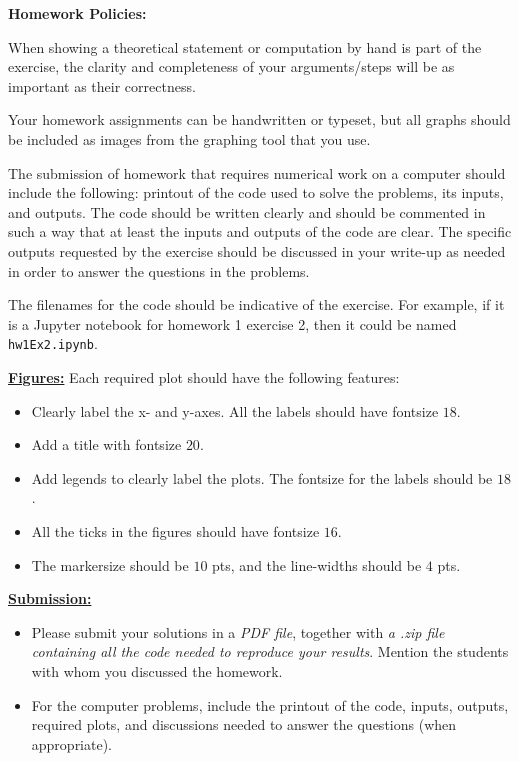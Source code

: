 \documentclass[10pt,twoside]{article}
\begin{document}
\vspace{0.2in}

\textbf{Homework Policies:}

When showing a theoretical statement or computation by hand is part of the exercise, the clarity and completeness of your arguments/steps will be as important as their correctness. 

\vspace{0.1in}


Your homework assignments can be handwritten or typeset, but all graphs should be included as images from the graphing tool that you use.

\vspace{0.1in}

The submission of homework that requires numerical work on a computer should include the following: printout of the code used to solve the problems, its inputs, and outputs. The code should be written clearly and should be commented in such a way that at least the inputs and outputs of the code are clear. The specific outputs requested by the exercise should be discussed in your write-up as needed in order to answer the questions in the problems. 

\vspace{0.1in}
The filenames for the code should be indicative of the exercise. For example, if it is a Jupyter notebook for homework 1 exercise 2, then it could be named \texttt{hw1Ex2.ipynb}.


\vspace{0.1in}


\textbf{\underline{Figures:}} 
Each required plot should have the following features:
\begin{itemize}
\item Clearly label the x- and y-axes. All the labels should have fontsize $18$. 
\item Add a title with fontsize $20$.
\item Add legends to clearly label the plots. The fontsize for the labels should be $18$. 
\item All the ticks in the figures should have fontsize $16$.
\item The markersize should be $10$ pts, and the line-widths should be $4$ pts. 
\end{itemize}


\textbf{\underline{Submission:}}

\begin{itemize}
\item Please submit your solutions in a \emph{PDF file}, together with \emph{a .zip file containing all the code needed to reproduce your results}. Mention the students with whom you discussed the homework. 

\item For the computer problems, include the printout of the code, inputs, outputs, required plots, and discussions needed to answer the questions (when appropriate).

\end{itemize}
\end{document}
